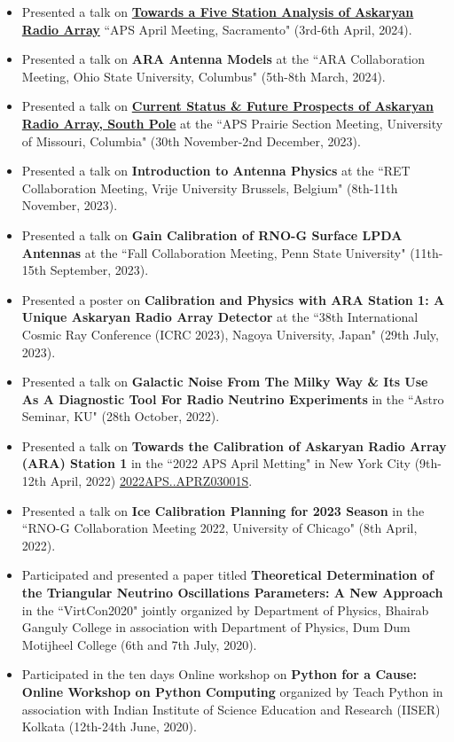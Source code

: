 \documentclass[10pt]{report}
\begin{document}
\begin{itemize}
\item Presented a talk on \href{https://meetings.aps.org/Meeting/APR24/Session/J03.3}{\bf Towards a Five Station Analysis of Askaryan Radio Array} ``APS April Meeting, Sacramento"  (3rd-6th April, 2024).
\item Presented a talk on {\bf ARA Antenna Models}  at the ``ARA Collaboration Meeting, Ohio State University, Columbus"  (5th-8th March, 2024).
\item Presented a talk on \href{https://meetings.aps.org/Meeting/PSF23/Session/T03.1}{\bf Current Status \& Future Prospects of Askaryan Radio Array, South Pole}  at the ``APS Prairie Section Meeting, University of Missouri, Columbia"  (30th November-2nd December, 2023).
\item Presented a talk on {\bf Introduction to Antenna Physics}  at the ``RET Collaboration Meeting, Vrije University Brussels, Belgium"  (8th-11th November, 2023).
\item Presented a talk on {\bf Gain Calibration of RNO-G Surface LPDA Antennas}  at the ``Fall Collaboration Meeting, Penn State University"  (11th-15th September, 2023).
\item Presented a poster on {\bf Calibration and Physics with ARA Station 1: A Unique Askaryan Radio Array Detector}  at the ``38th International Cosmic Ray Conference (ICRC 2023), Nagoya University, Japan"  (29th July, 2023).
\item Presented a talk on {\bf Galactic Noise From The Milky Way \& Its Use As A
Diagnostic Tool For Radio Neutrino Experiments} in the ``Astro Seminar, KU"  (28th October, 2022).
\item Presented a talk on {\bf Towards the Calibration of Askaryan Radio Array (ARA) Station 1}  in the ``2022 APS April Metting" in New York City (9th-12th April, 2022) \href{https://ui.adsabs.harvard.edu/abs/2022APS..APRZ03001S/abstract}{2022APS..APRZ03001S}.
\item Presented a talk on {\bf Ice Calibration Planning for 2023 Season}  in the ``RNO-G Collaboration Meeting 2022, University of Chicago"  (8th April, 2022).
\item Participated and presented a paper titled {\bf Theoretical Determination of the Triangular Neutrino Oscillations Parameters: A New Approach}  in the ``VirtCon2020"  jointly organized by Department of Physics, Bhairab Ganguly College in association with Department of Physics, Dum Dum Motijheel College (6th and 7th July, 2020).
\item Participated in the ten days Online workshop on \textbf{Python for a Cause: Online Workshop on Python Computing} organized by Teach Python in association with Indian Institute of Science Education and Research (IISER) Kolkata (12th-24th June, 2020).

\end{itemize}
\end{document}
